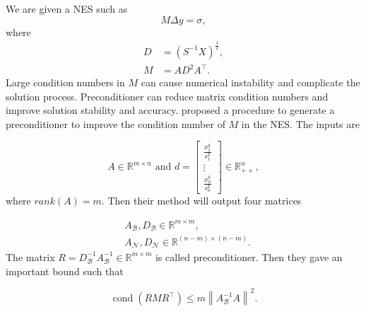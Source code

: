 We are given a NES such as 
$$
M \Delta y=\sigma,
$$
where
$$
\begin{aligned}
D & = (S^{-1} X)^{\frac{1}{2}},\\
M & = A D^2 A^{\top}.
\end{aligned}
$$
Large condition numbers in $M$ can cause numerical instability and complicate the solution process. Preconditioner can reduce matrix condition numbers and improve solution stability and accuracy.  \cite{monteiro2004uniform} proposed a procedure to generate a preconditioner to improve the condition number of $M$ in the NES. The inputs are

$$
A \in \mathbb{R}^{m \times n} \text { and } d=\left[\begin{array}{c}
\frac{x_1^k}{s_1^k} \\
\vdots \\
\frac{x_n^k}{s_n^k}
\end{array}\right] \in \mathbb{R}_{++}^n,
$$
where $rank(A)=m$. Then their method will output four matrices 

$$
\begin{aligned}
& A_{\mathcal{B}}, D_{\mathcal{B}} \in \mathbb{R}^{m \times m}, \\
& A_{\mathcal{N}}, D_{\mathcal{N}} \in \mathbb{R}^{(n-m) \times (n-m)}.
\end{aligned}
$$
The matrix $R=D_{\mathcal{B}}^{-1} A_{\mathcal{B}}^{-1} \in \mathbb{R}^{m \times m}$ is called preconditioner.
Then they gave an important bound such that

$$
\operatorname{cond}\left(R M R^{\top}\right) \leq m \left\|A_{\mathcal{B}}^{-1} A\right\|^2.
$$

